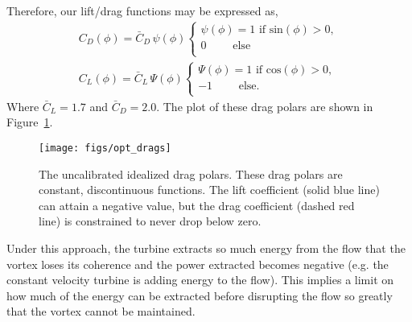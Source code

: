 Therefore, our lift/drag functions may be expressed as,
\begin{align*} 
 C_D(\phi) = \bar C_D \, \psi(\phi) 
  \begin{cases}
   \psi(\phi) = 1 \text{ if sin}(\phi) > 0,   \\
   0 \quad\quad\text{    else} \\
  \end{cases} \\
 C_L(\phi) = \bar C_L \, \Psi(\phi) 
  \begin{cases}
   \Psi(\phi) = 1 \text{ if cos}(\phi) > 0,   \\
   -1 \quad\quad\text{ else}. \\
  \end{cases}
\end{align*}
Where $\bar C_L = 1.7$ and $\bar C_D = 2.0$. The plot of these drag
polars are shown in Figure~\ref{drags}. 

\begin{figure}[!htb]
  \begin{center}
    \texttt{[image: figs/opt\_drags]}
    \caption{The uncalibrated idealized drag polars. 
   These drag polars are constant, discontinuous functions. The lift
   coefficient (solid blue line) can attain a negative value, but the
   drag coefficient (dashed red line) is constrained to never drop below
   zero.}  
    \label{drags}
  \end{center}
\end{figure}


Under this approach, the turbine extracts so much energy from the flow
that the vortex loses its coherence and the power extracted becomes
negative (e.g. the constant velocity turbine is adding energy to the
flow). This implies a limit on how much of the energy can be extracted
before disrupting the flow so greatly that the vortex cannot be
maintained.


